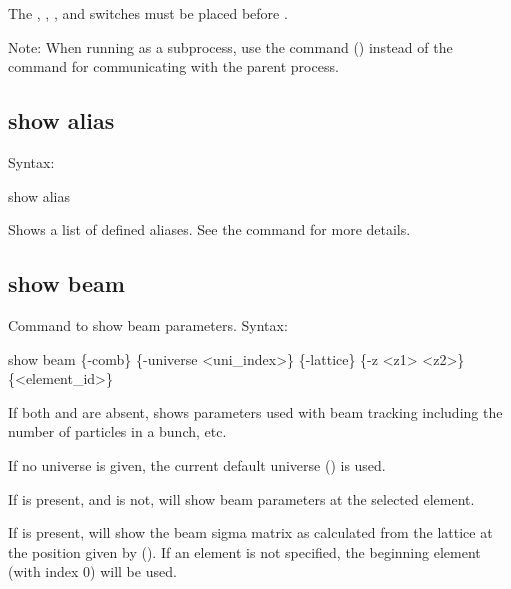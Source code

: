 {{{{{{{{The , , , and  switches must be placed before
.

Note: When running \tao as a subprocess, use the  command ()
instead of the  command for communicating with the parent process.



\subsection{show alias}
\label{s:show.alias}

Syntax:
\begin{example}
  show alias
\end{example}

Shows a list of defined aliases. See the  command for more details.


\subsection{show beam}
\label{s:show.beam}

Command to show beam parameters. Syntax:
\begin{example}
  show beam \{-comb\} \{-universe <uni_index>\} \{-lattice\} \{-z <z1> <z2>\} \{<element_id>\}
\end{example}

If both  and  are absent,  shows parameters
used with beam tracking including the number of particles in a bunch, etc.

If no universe is given, the current default universe () is used.

If  is present, and  is not,  will show beam
parameters at the selected element. 

If  is present,  will show the beam sigma matrix as calculated from the
lattice at the position given by  (). If an
element is not specified, the beginning element (with index 0) will be used.

}}}}}}}}
